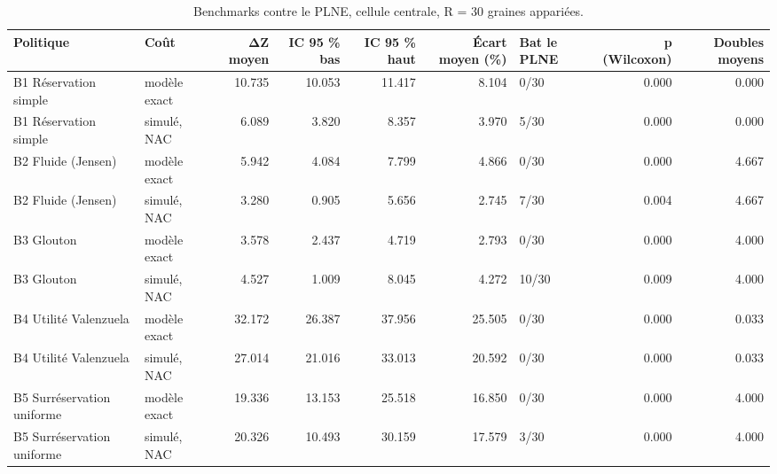 \begin{table}[htbp]
\caption{Benchmarks contre le PLNE, cellule centrale, R = 30 graines appariées.}
\label{tab:benchmarks}
\begin{tabular}{llrrrrlrr}
\toprule
Politique & Coût & ΔZ moyen & IC 95 \% bas & IC 95 \% haut & Écart moyen (\%) & Bat le PLNE & p (Wilcoxon) & Doubles moyens \\
\midrule
B1 Réservation simple & modèle exact & 10.735 & 10.053 & 11.417 & 8.104 & 0/30 & 0.000 & 0.000 \\
B1 Réservation simple & simulé, NAC & 6.089 & 3.820 & 8.357 & 3.970 & 5/30 & 0.000 & 0.000 \\
B2 Fluide (Jensen) & modèle exact & 5.942 & 4.084 & 7.799 & 4.866 & 0/30 & 0.000 & 4.667 \\
B2 Fluide (Jensen) & simulé, NAC & 3.280 & 0.905 & 5.656 & 2.745 & 7/30 & 0.004 & 4.667 \\
B3 Glouton & modèle exact & 3.578 & 2.437 & 4.719 & 2.793 & 0/30 & 0.000 & 4.000 \\
B3 Glouton & simulé, NAC & 4.527 & 1.009 & 8.045 & 4.272 & 10/30 & 0.009 & 4.000 \\
B4 Utilité Valenzuela & modèle exact & 32.172 & 26.387 & 37.956 & 25.505 & 0/30 & 0.000 & 0.033 \\
B4 Utilité Valenzuela & simulé, NAC & 27.014 & 21.016 & 33.013 & 20.592 & 0/30 & 0.000 & 0.033 \\
B5 Surréservation uniforme & modèle exact & 19.336 & 13.153 & 25.518 & 16.850 & 0/30 & 0.000 & 4.000 \\
B5 Surréservation uniforme & simulé, NAC & 20.326 & 10.493 & 30.159 & 17.579 & 3/30 & 0.000 & 4.000 \\
\bottomrule
\end{tabular}
\end{table}
